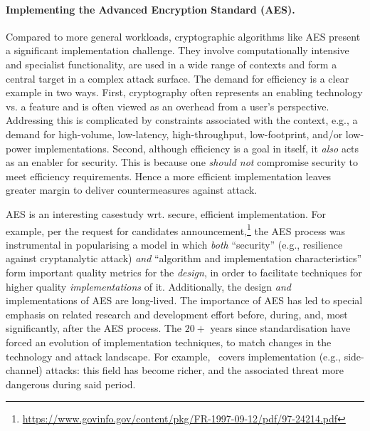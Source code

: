 
\paragraph{Implementing the Advanced Encryption Standard (AES).}

%
%

Compared to more general workloads, cryptographic algorithms like AES
present a significant implementation challenge.
They involve computationally intensive and specialist functionality,
are used in a wide range of contexts
and
form a central target in a complex attack surface.
The demand for efficiency is a clear example in two ways.
First,
cryptography often represents an enabling technology vs. a feature and
is often viewed as an overhead from a user's perspective.
Addressing this is
complicated by constraints associated with the context, e.g., a demand 
for
high-volume, 
 low-latency, 
high-throughput, 
 low-footprint, 
and/or 
 low-power
 implementations.
Second,
although efficiency is a goal in itself, it {\em also} 
acts as an enabler for security.
This is because one {\em should not}
compromise security to meet efficiency requirements.
Hence a more efficient implementation leaves greater margin to deliver
countermeasures against attack.

AES is an interesting casestudy wrt. secure, efficient implementation.
For example,
per the request for candidates announcement,\footnote{%
\url{https://www.govinfo.gov/content/pkg/FR-1997-09-12/pdf/97-24214.pdf}
} the AES process was instrumental in popularising a model in which
{\em both}
``security''
(e.g., resilience against cryptanalytic attack)
{\em and}
``algorithm and implementation characteristics''
form important quality metrics for the {\em design}, in order to facilitate
techniques for higher quality {\em implementations} of it.
Additionally,
the design {\em and} implementations of AES are long-lived.
The importance of AES has led to special emphasis on related
research and development effort before, during, and, most significantly, 
after the AES process.
The $20+$ years since standardisation have forced an evolution of 
implementation techniques, to match changes in the technology 
and attack landscape.  For example,~\cite[Section 3.6]{NBBBDFR:01} covers
implementation (e.g., side-channel) attacks: this field has become richer,
and the associated threat more dangerous during said period.

